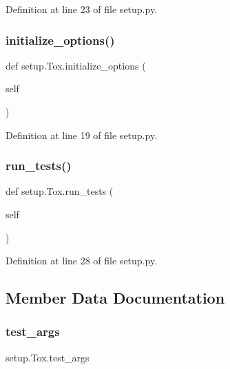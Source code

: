 Definition at line 23 of file setup.\+py.

\hypertarget{classsetup_1_1_tox_aac0c8e14e51810383bcd4ec74d9f204b}{}\label{classsetup_1_1_tox_aac0c8e14e51810383bcd4ec74d9f204b} 
\subsubsection{\texorpdfstring{initialize\+\_\+options()}{initialize\_options()}}
{\footnotesize\ttfamily def setup.\+Tox.\+initialize\+\_\+options (\begin{DoxyParamCaption}\item[{}]{self }\end{DoxyParamCaption})}



Definition at line 19 of file setup.\+py.

\hypertarget{classsetup_1_1_tox_a300d28131f173af7c0db7f5d284ae569}{}\label{classsetup_1_1_tox_a300d28131f173af7c0db7f5d284ae569} 
\subsubsection{\texorpdfstring{run\+\_\+tests()}{run\_tests()}}
{\footnotesize\ttfamily def setup.\+Tox.\+run\+\_\+tests (\begin{DoxyParamCaption}\item[{}]{self }\end{DoxyParamCaption})}



Definition at line 28 of file setup.\+py.



\subsection{Member Data Documentation}
\hypertarget{classsetup_1_1_tox_a59158127695b4f7b88100af0d4fa80be}{}\label{classsetup_1_1_tox_a59158127695b4f7b88100af0d4fa80be} 
\subsubsection{\texorpdfstring{test\+\_\+args}{test\_args}}
{\footnotesize\ttfamily setup.\+Tox.\+test\+\_\+args}



